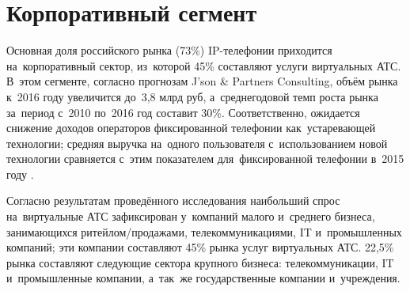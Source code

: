 \section{Корпоративный сегмент}

Основная доля российского рынка (73\%) IP-телефонии приходится на~корпоративный сектор, из~которой 45\% составляют услуги виртуальных АТС.
В~этом сегменте, согласно прогнозам J'son \& Partners Consulting, объём рынка к~2016 году увеличится до~3,8 млрд руб, а~среднегодовой темп роста рынка за~период с~2010 по~2016 год составит 30\%.
Соответственно, ожидается снижение доходов операторов фиксированной телефонии как~устаревающей технологии; средняя выручка на~одного пользователя с~использованием новой технологии сравняется с~этим показателем для~фиксированной телефонии в~2015 году .

Согласно результатам проведённого исследования  наибольший спрос на~виртуальные АТС зафиксирован у~компаний малого и~среднего бизнеса, занимающихся ритейлом/продажами, телекоммуникациями, IT и~промышленных компаний; эти компании составляют 45\% рынка услуг виртуальных АТС.
22,5\% рынка составляют следующие сектора крупного бизнеса: телекоммуникации, IT и~промышленные компании, а~так~же государственные компании и~учреждения.